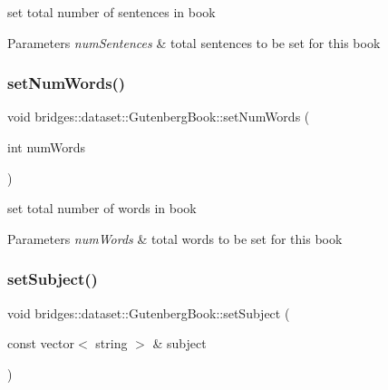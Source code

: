 set total number of sentences in book 
\begin{DoxyParams}{Parameters}
{\em num\+Sentences} & total sentences to be set for this book \\
\hline
\end{DoxyParams}
\mbox{\label{classbridges_1_1dataset_1_1_gutenberg_book_a4ff46e5a2873feec4c0e6b773320bed5}} 
\subsubsection{\texorpdfstring{set\+Num\+Words()}{setNumWords()}}
{\footnotesize\ttfamily void bridges\+::dataset\+::\+Gutenberg\+Book\+::set\+Num\+Words (\begin{DoxyParamCaption}\item[{int}]{num\+Words }\end{DoxyParamCaption})\hspace{0.3cm}{\ttfamily [inline]}}

set total number of words in book 
\begin{DoxyParams}{Parameters}
{\em num\+Words} & total words to be set for this book \\
\hline
\end{DoxyParams}
\mbox{\label{classbridges_1_1dataset_1_1_gutenberg_book_a88a49679dcbb7992c9c526f4d6f3049b}} 
\subsubsection{\texorpdfstring{set\+Subject()}{setSubject()}}
{\footnotesize\ttfamily void bridges\+::dataset\+::\+Gutenberg\+Book\+::set\+Subject (\begin{DoxyParamCaption}\item[{const vector$<$ string $>$ \&}]{subject }\end{DoxyParamCaption})\hspace{0.3cm}{\ttfamily [inline]}}

